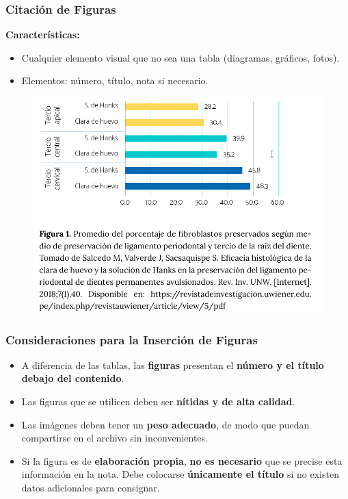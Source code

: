 \documentclass[
11pt, %
]{beamer}
\begin{document}
\begin{frame}
	\frametitle{Citación de Figuras}

	\textbf{Características:}
	\begin{itemize}
		\item Cualquier elemento visual que no sea una tabla (diagramas, gráficos, fotos).
		\item Elementos: número, título, nota si necesario.
	\end{itemize}

	\begin{figure}[H]
		\centering
		\includegraphics[width=0.5\linewidth]{images/Screenshot_20250206_054632.png}
	\end{figure}

\end{frame}

\begin{frame}
	\frametitle{Consideraciones para la Inserción de Figuras}

	\begin{itemize}
		\item A diferencia de las tablas, las \textbf{figuras} presentan el \textbf{número y el título} \textbf{debajo del contenido}.
		\item Las figuras que se utilicen deben ser \textbf{nítidas y de alta calidad}.
		\item Las imágenes deben tener un \textbf{peso adecuado}, de modo que puedan compartirse en el archivo sin inconvenientes.
		\item Si la figura es de \textbf{elaboración propia}, \textbf{no es necesario} que se precise esta información en la nota. Debe colocarse \textbf{únicamente el título} si no existen datos adicionales para consignar.
	\end{itemize}

\end{frame}
\end{document}
